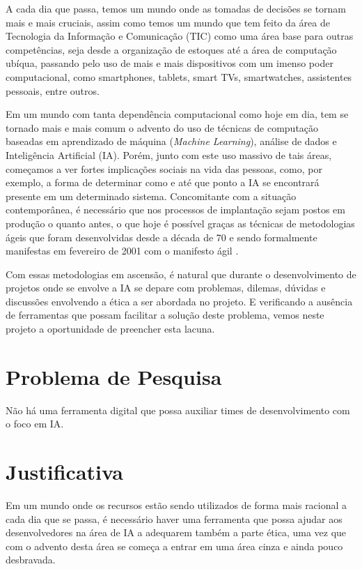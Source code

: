 \label{introducao}

A cada dia que passa, temos um mundo onde as tomadas de decisões se tornam mais e mais cruciais, assim como temos um mundo que tem feito da área de Tecnologia da Informação e Comunicação (TIC) como uma área base para outras competências, seja desde a organização de estoques até a área de computação ubíqua, passando pelo uso de mais e mais dispositivos com um imenso poder computacional, como smartphones, tablets, smart TVs, smartwatches, assistentes pessoais, entre outros. 

Em um mundo com tanta dependência computacional como hoje em dia, tem se tornado mais e mais comum o advento do uso de técnicas de computação baseadas em aprendizado de máquina (\textit{Machine Learning}), análise de dados e Inteligência Artificial (IA). Porém, junto com este uso massivo de tais áreas, começamos a ver fortes implicações sociais na vida das pessoas, como, por exemplo, a forma de determinar como e até que ponto a \acrshort{IA} se encontrará presente em um determinado sistema. Concomitante com a situação contemporânea, é necessário que nos processos de implantação sejam postos em produção o quanto antes, o que hoje é possível graças as técnicas de metodologias ágeis que foram desenvolvidas desde a década de 70 e sendo formalmente manifestas em fevereiro de 2001 com o manifesto ágil \cite{agilemanifesto}. 

Com essas metodologias em ascensão, é natural que durante o desenvolvimento de projetos onde se envolve a \acrshort{IA} se depare com problemas, dilemas, dúvidas e discussões envolvendo a ética a ser abordada no projeto. E verificando a ausência de ferramentas que possam facilitar a solução deste problema, vemos neste projeto a oportunidade de preencher esta lacuna.

\section{Problema de Pesquisa}

Não há uma ferramenta digital que possa auxiliar times de desenvolvimento com o foco em \acrshort{IA}. 

\section{Justificativa}

Em um mundo onde os recursos estão sendo utilizados de forma mais racional a cada dia que se passa, é necessário haver uma ferramenta que possa ajudar aos desenvolvedores na área de \acrshort{IA} a adequarem também a parte ética, uma vez que com o advento desta área se começa a entrar em uma área cinza e ainda pouco desbravada.

